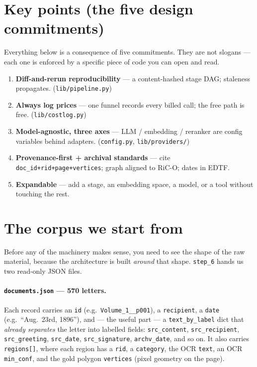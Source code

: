 \documentclass[11pt]{article}
\newcommand{\code}[1]{\texttt{#1}}
\begin{document}
\section{Key points (the five design commitments)}

Everything below is a consequence of five commitments. They are not slogans --- each one is enforced
by a specific piece of code you can open and read.

\begin{keybox}
\begin{enumerate}[leftmargin=1.4em, itemsep=2pt]
  \item \textbf{Diff-and-rerun reproducibility} --- a content-hashed stage DAG; staleness propagates.
        (\code{lib/pipeline.py})
  \item \textbf{Always log prices} --- one funnel records every billed call; the free path is free.
        (\code{lib/costlog.py})
  \item \textbf{Model-agnostic, three axes} --- LLM / embedding / reranker are config variables
        behind adapters. (\code{config.py}, \code{lib/providers/})
  \item \textbf{Provenance-first + archival standards} --- cite \code{doc\_id+rid+page+vertices};
        graph aligned to RiC-O; dates in EDTF.
  \item \textbf{Expandable} --- add a stage, an embedding space, a model, or a tool without touching
        the rest.
\end{enumerate}
\end{keybox}

\section{The corpus we start from}

Before any of the machinery makes sense, you need to see the shape of the raw material, because the
architecture is built \emph{around} that shape. \code{step\_6} hands us two read-only JSON files.

\paragraph{\code{documents.json} --- 570 letters.} Each record carries an \code{id} (e.g.\
\code{Volume\_1\_\_p001}), a \code{recipient}, a \code{date} (e.g.\ ``Aug.\ 23rd, 1896''), and --- the
useful part --- a \code{text\_by\_label} dict that \emph{already separates} the letter into labelled
fields: \code{src\_content}, \code{src\_recipient}, \code{src\_greeting}, \code{src\_date},
\code{src\_signature}, \code{archv\_date}, and so on. It also carries \code{regions[]}, where each
region has a \code{rid}, a \code{category}, the OCR \code{text}, an OCR \code{min\_conf}, and the gold
polygon \code{vertices} (pixel geometry on the page).
\end{document}
